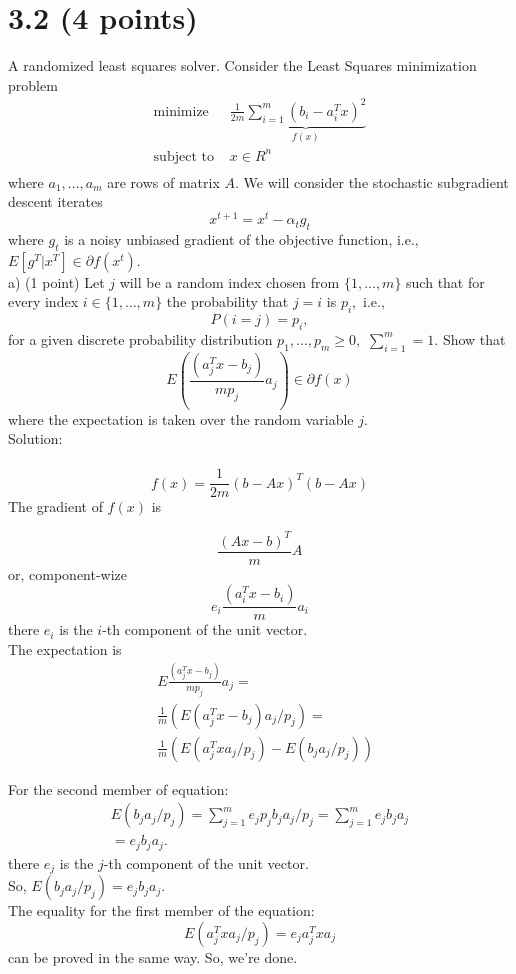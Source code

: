 \documentclass{article}
\begin{document}
\section*{3.2 (4 points)} 
A randomized least squares solver. Consider the Least Squares minimization
problem
\begin{align*}
	\text{minimize } & \frac{1}{2 m} 
	\underbrace{\sum_{i = 1}^{m}
	(b_i - a_i^T x)^2}_{f(x)}
	\\
	\text{subject to } & x \in R^n \\
\end{align*}
where $a_1, \dots , a_m$ are rows of matrix $A.$
We will consider the stochastic
subgradient descent iterates
\begin{equation} \tag {1}
x^{t + 1} = x^t - \alpha_t g_t
\end {equation}
where $g_t$ is a noisy unbiased gradient of the objective function, i.e., $E[g^T|x^T] \in \partial f(x^t). $ \\

a) (1 point) Let  $j$ will be a random index chosen from 
$\{1, \dots, m\}$ such that for every index 
$i \in \{1, \dots, m\}$ the probability that $j = i$
is $p_i,$ i.e., 
$$
P(i = j) = p_i,
$$
for a given discrete probability distribution
$p_1, \dots, p_m \geq 0, $
$\sum_{i=1}^{m} = 1.$ 
Show that 
$$
E(\frac{(a_j^T x - b_j)}{m p_j} a_j) \in \partial f(x)
$$
where the expectation is taken over the random variable $j.$ \\

Solution: \\ \\

$$
f(x) = \frac{1}{2 m} (b - Ax)^T (b - Ax)
$$
The gradient of $f(x)$ is

$$
\frac{(A x - b)^T}{m} A
$$
or, component-wize
$$
e_i\frac{(a_i^T x - b_i)}{m} a_i
$$
there $e_i $  is the $i$-th component of the unit vector. \\
The expectation is
\begin{align*}
&E\frac{(a_j^T x - b_j)}{m p_j} a_j = \\
&\frac{1}{m} (E(a_j^T x - b_j) a_j / p_j)  = \\
&\frac{1}{m} (E(a_j^T x a_j / p_j) - E(b_ja_j / p_j))
\end{align*}

For the second member of equation:
\begin{align*}
E(b_j a_j / p_j)  = 
\sum_{j=1}^m e_j p_j b_j a_j / p_j = 
\sum_{j=1}^m e_j b_j a_j \\=  e_j b_j a_j.
\end{align*}	
there $e_j $  is the $j$-th component of the unit vector. \\
So, $ E(b_j a_j/p_j) = e_j b_j a_j.$ \\
The equality for the first member of the equation:
$$
E(a_j^T x a_j/p_j) = e_j a_j^T x a_j
$$
can be proved in the same way.
So, we're done. \\
\end{document}
